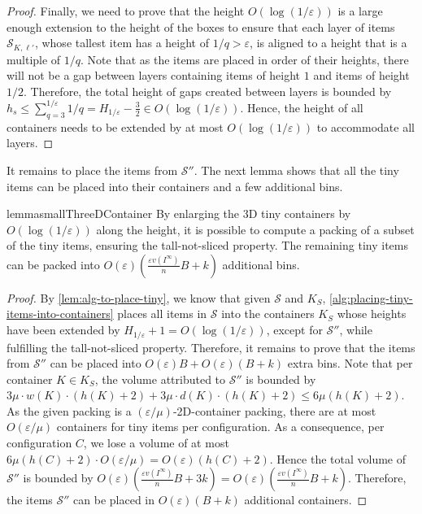 \documentclass[a4paper,UKenglish,cleveref, autoref, thm-restate]{lipics-v2021}
\newcommand{\eps}{\varepsilon}
\newcommand{\tin}{tiny\xspace}
\begin{document}
\begin{proof}
Finally, we need to prove that the height $O(\log(1/\eps))$ is a large enough extension to the height of the boxes to ensure that each layer of items $\mathcal{S}_{K,\ell'}$, whose tallest item has a height of $1/q > \eps$, is aligned to a height that is a multiple of $1/q$. Note that as the items are placed in order of their heights, there will not be a gap between layers containing items of height $1$ and items of height $1/2$. Therefore, the total height of gaps created between layers is bounded by $h_s \leq \sum_{q = 3}^{1/\eps}1/q = H_{1/\eps}-\frac{3}{2} \in O(\log(1/\eps))$.
Hence, the height of all containers needs to be extended by at most $O(\log(1/\eps))$ to accommodate all layers.
\end{proof}

It remains to place the items from $\mathcal{S}''$. The next lemma shows that all the \tin items can be placed into their containers and a few additional bins.

\begin{restatable}{lemma}{smallThreeDContainer}
    By enlarging the 3D tiny containers by $O(\log (1/\eps))$ along the height, it is possible to compute a packing of a subset of the tiny items, ensuring the tall-not-sliced property. The remaining tiny items can be packed into $O(\eps)(\frac{\eps v(I^{\infty})}{n}B+k)$ additional bins.
\end{restatable}
\begin{proof}
By \cref{lem:alg-to-place-tiny}, we know that given $\mathcal{S}$ and $K_S$, \cref{alg:placing-tiny-items-into-containers}  places all items in $\mathcal{S}$ into the containers $K_S$ whose heights have been extended by $H_{1/\eps}+1 = O(\log(1/\eps))$, except for $\mathcal{S}''$,  while fulfilling the tall-not-sliced property.
Therefore, it remains to prove that the items from $\mathcal{S}''$ can be placed into $O(\eps)B + O(\eps)(B+k)$ extra bins.
Note that per container $K \in K_S$, the volume attributed to $\mathcal{S}''$ is bounded by
$3\mu \cdot w(K) \cdot (h(K)+2) + 3\mu \cdot d(K) \cdot (h(K)+2) \leq 6\mu (h(K)+2)$.
As the given packing is a $(\eps/\mu)$-2D-container packing, there are at most $O(\eps/\mu)$ containers for \tin items per configuration.
As a consequence, per configuration $C$, we lose a volume of at most $6\mu (h(C)+2) \cdot O(\eps/\mu) = O(\eps)(h(C)+2)$.
Hence the total volume of $\mathcal{S}''$ is bounded by $O(\eps)(\frac{\eps v(I^{\infty})}{n}B+3k) = O(\eps)(\frac{\eps v(I^{\infty})}{n} B+k)$.
Therefore, the items $\mathcal{S}''$ can be placed in $O(\eps)(B+k)$ additional containers.
\end{proof}
\end{document}

